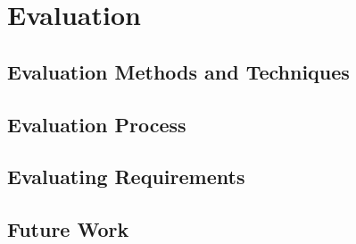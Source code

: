 \chapter{Evaluation}
\label{chap:evaluation}

\section{Evaluation Methods and Techniques}
\label{evaluation:methods-and-technicques}

\section{Evaluation Process}
\label{evaluation:process}

\section{Evaluating Requirements}
\label{evaluation:requirements}

\section{Future Work}
\label{evaluation:future}